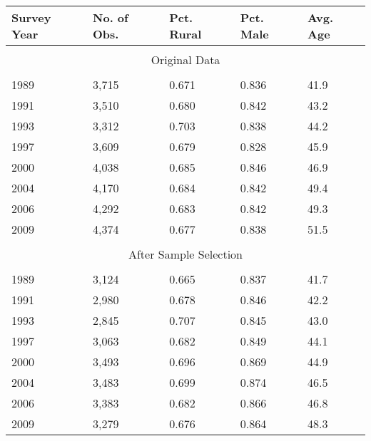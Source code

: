 \begin{tabular}{l p{2cm} p{2cm} p{2cm} p{2cm}}
\toprule
Survey Year & No. of Obs.  & Pct. Rural                & Pct. Male     & Avg. Age                      \\
\midrule \\
\multicolumn{5}{c}{Original Data}  \\
\\
1989            &      3,715  &       0.671       &  0.836       &       41.9          \\
1991            &      3,510  &       0.680       &  0.842       &       43.2          \\
1993            &      3,312  &       0.703       &  0.838       &       44.2          \\
1997            &      3,609  &       0.679       &  0.828       &       45.9          \\
2000            &      4,038  &       0.685       &  0.846       &       46.9          \\
2004            &      4,170  &       0.684       &  0.842       &       49.4          \\
2006            &      4,292  &       0.683       &  0.842       &       49.3          \\
2009            &      4,374  &       0.677       &  0.838       &       51.5          \\
\\
\multicolumn{5}{c}{After Sample Selection}  \\
\\
1989            &      3,124  &       0.665       &  0.837       &       41.7          \\
1991            &      2,980  &       0.678       &  0.846       &       42.2          \\
1993            &      2,845  &       0.707       &  0.845       &       43.0          \\
1997            &      3,063  &       0.682       &  0.849       &       44.1          \\
2000            &      3,493  &       0.696       &  0.869       &       44.9          \\
2004            &      3,483  &       0.699       &  0.874       &       46.5          \\
2006            &      3,383  &       0.682       &  0.866       &       46.8          \\
2009            &      3,279  &       0.676       &  0.864       &       48.3          \\

\end{tabular}
